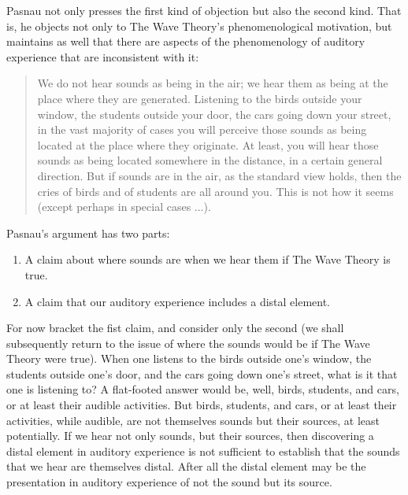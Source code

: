 \documentclass[12pt]{article}
\begin{document}
Pasnau not only presses the first kind of objection but also the second kind. That is, he objects not only to The Wave Theory’s phenomenological motivation, but maintains as well that there are aspects of the phenomenology of auditory experience that are inconsistent with it:
\begin{quote}
	We do not hear sounds as being in the air; we hear them as being at the place where they are generated. Listening to the birds outside your window, the students outside your door, the cars going down your street, in the vast majority of cases you will perceive those sounds as being located at the place where they originate. At least, you will hear those sounds as being located somewhere in the distance, in a certain general direction. But if sounds are in the air, as the standard view holds, then the cries of birds and of students are all around you. This is not how it seems (except perhaps in special cases ...). 
\end{quote}

Pasnau's argument has two parts:
\begin{enumerate}
	\item A claim about where sounds are when we hear them if The Wave Theory is true.
	\item A claim that our auditory experience includes a distal element.
\end{enumerate}
For now bracket the fist claim, and consider only the second (we shall subsequently return to the issue of where the sounds would be if The Wave Theory were true). When one listens to the birds outside one’s window, the students outside one’s door, and the cars going down one’s street, what is it that one is listening to? A flat-footed answer would be, well, birds, students, and cars, or at least their audible activities. But birds, students, and cars, or at least their activities, while audible, are not themselves sounds but their sources, at least potentially. If we hear not only sounds, but their sources, then discovering a distal element in auditory experience is not sufficient to establish that the sounds that we hear are themselves distal. After all the distal element may be the presentation in auditory experience of not the sound but its source.
\end{document}
